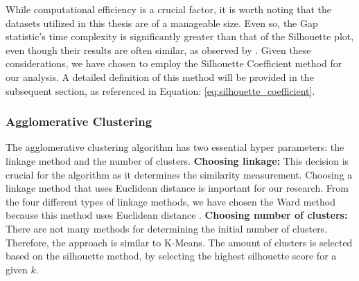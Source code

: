 While computational efficiency is a crucial factor, it is worth noting that the datasets utilized in this thesis are of a manageable size. 
Even so, the Gap statistic's time complexity is significantly greater than that of the Silhouette plot, even though their results are often similar, as observed by \citep{yuan_research_2019}. 
Given these considerations, we have chosen to employ the Silhouette Coefficient method for our analysis. A detailed definition of this method will be provided in the subsequent section, as referenced in Equation: \ref{eq:silhouette_coefficient}.

\subsubsection{Agglomerative Clustering} \label{theory:clustering-agglomerative}
The agglomerative clustering algorithm has two essential hyper parameters: the linkage method and the number of clusters. \newline
\textbf{Choosing linkage:}
This decision is crucial for the algorithm as it determines the similarity measurement.
Choosing a linkage method that uses Euclidean distance is important for our research.
From the four different types of linkage methods, we have chosen the Ward method because this method uses Euclidean distance \citep{roux_comparative_2015,seetharaman_brief_2019}. \newline
\textbf{Choosing number of clusters:}
There are not many methods for determining the initial number of clusters.
Therefore, the approach is similar to K-Means.
The amount of clusters is selected based on the silhouette method, by selecting the highest silhouette score for a given $k$.


